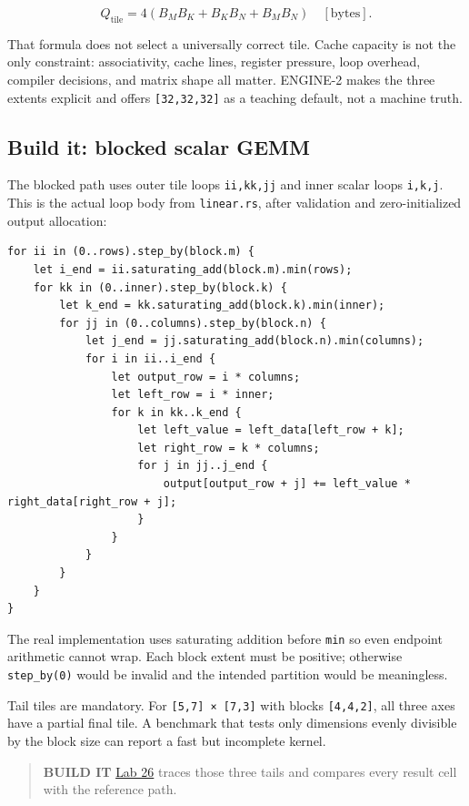 \documentclass[
  10pt,
]{article}
\begin{document}
\[
Q_{\mathrm{tile}}=4(B_MB_K+B_KB_N+B_MB_N)\quad[\mathrm{bytes}].
\]

That formula does not select a universally correct tile. Cache capacity
is not the only constraint: associativity, cache lines, register
pressure, loop overhead, compiler decisions, and matrix shape all
matter. ENGINE-2 makes the three extents explicit and offers
\texttt{{[}32,32,32{]}} as a teaching default, not a machine truth.

\subsection{Build it: blocked scalar
GEMM}\label{build-it-blocked-scalar-gemm}

The blocked path uses outer tile loops \texttt{ii,kk,jj} and inner
scalar loops \texttt{i,k,j}. This is the actual loop body from
\texttt{linear.rs}, after validation and zero-initialized output
allocation:

\begin{verbatim}
for ii in (0..rows).step_by(block.m) {
    let i_end = ii.saturating_add(block.m).min(rows);
    for kk in (0..inner).step_by(block.k) {
        let k_end = kk.saturating_add(block.k).min(inner);
        for jj in (0..columns).step_by(block.n) {
            let j_end = jj.saturating_add(block.n).min(columns);
            for i in ii..i_end {
                let output_row = i * columns;
                let left_row = i * inner;
                for k in kk..k_end {
                    let left_value = left_data[left_row + k];
                    let right_row = k * columns;
                    for j in jj..j_end {
                        output[output_row + j] += left_value * right_data[right_row + j];
                    }
                }
            }
        }
    }
}
\end{verbatim}

The real implementation uses saturating addition before \texttt{min} so
even endpoint arithmetic cannot wrap. Each block extent must be
positive; otherwise \texttt{step\_by(0)} would be invalid and the
intended partition would be meaningless.

Tail tiles are mandatory. For \texttt{{[}5,7{]}\ ×\ {[}7,3{]}} with
blocks \texttt{{[}4,4,2{]}}, all three axes have a partial final tile. A
benchmark that tests only dimensions evenly divisible by the block size
can report a fast but incomplete kernel.

\begin{quote}
\textbf{BUILD IT}
\href{https://github.com/hermonai/inside-the-llm-engine/blob/astra-visual-rewrite/labs/lab-26-blocked-gemm.md}{Lab
26} traces those three tails and compares every result cell with the
reference path.
\end{quote}
\end{document}
